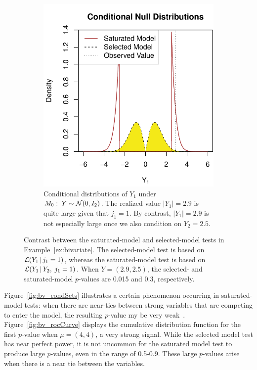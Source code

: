 \documentclass{article}
\begin{document}
\begin{figure}
\begin{subfigure}[t]{.4\textwidth}
    \includegraphics[width=\textwidth]{figs/bivariateSelVSat_nullDists.pdf}
    \caption{Conditional distributions of $Y_1$ under
      $M_0:\; Y \sim \mathcal{N}(0,I_2)$. The realized value $|Y_1|=2.9$ is
      quite large given that $j_1=1$. By
      contrast, $|Y_1|=2.9$ is not especially large once we 
      also condition on $Y_2=2.5$.}
  \end{subfigure}
  \caption{Contrast between the saturated-model and selected-model
    tests in Example~\ref{ex:bivariate}. The selected-model test is based on  $\mathcal{L}(Y_1 \,|\, j_1=1)$,  whereas the saturated-model test is based on $\mathcal{L}(Y_1  \,|\, Y_2, \; j_1=1)$. 
    When $Y=(2.9, 2.5)$, the selected- and saturated-model $p$-values are 0.015 and 0.3, respectively.}
  \label{fig:bv_nullDists}
\end{figure}


Figure~\ref{fig:bv_condSets} illustrates a certain phenomenon occurring in saturated-model tests: when there are near-ties between strong variables that are competing to enter the model, the resulting $p$-value my be very weak~\citep{lockhart2014significance}. Figure~\ref{fig:bv_rocCurve} displays the cumulative distribution function for the first $p$-value when $\mu=(4,4)$, a very strong signal. While the selected model test has near perfect power, it is not uncommon for the saturated model test to produce large $p$-values, even in the range of 0.5-0.9. These large $p$-values arise when there is a near tie between the variables.
\end{document}
